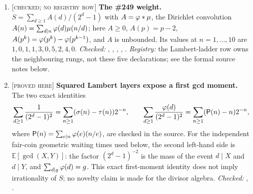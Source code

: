 \documentclass[11pt]{article}
\newcommand{\Stot}{S}
\newcommand{\Aw}{A}
\newcommand{\stag}[1]{{\normalfont\footnotesize\textsc{[#1]}}}
\begin{document}
{\begin{enumerate}[label=\textbf{R\arabic*.},ref=R\arabic*,leftmargin=2.4em,
  itemsep=0.2em,topsep=0.25em]
The orbit-level form sharpens this rank barrier without closing it: under the
same non-irrationality hypothesis, the same carry also has uniformly eventual
dyadic-section periodicity modulo $v$, as recorded by
.
This does not turn quotient periodicity into a finite-$\mathbb Q$-rank bound.
Indeed, if $p\mid v$, the totient forcing disappears modulo $p$ and the carry
is the homogeneous geometric orbit $u_N\equiv2^N u_0$ modulo $p$
(;
).
This is the natural obstruction to extracting the missing finite-rank upper
bound, so the irrationality of $\Stot$ remains open.

\item\label{res:weight} \stag{checked; no registry row}
\textbf{The \#249 weight.}  $\Stot=\sum_{d\ge1}\Aw(d)/(2^d-1)$ with
$\Aw=\ph*\mu$, the Dirichlet convolution
$\Aw(n)=\sum_{d\mid n}\ph(d)\mu(n/d)$; here $\Aw\ge0$, $\Aw(p)=p-2$,
$\Aw(p^k)=\ph(p^k)-\ph(p^{k-1})$, and $\Aw$ is unbounded.  Its values at
$n=1,\dots,10$ are $1,0,1,1,3,0,5,2,4,0$.
{\footnotesize\emph{Checked:}
,
,
,
,
.
\emph{Registry:} the Lambert-ladder row owns the neighbouring rungs, not these
five declarations; see the formal source notes below.}

\item\label{res:gcdmoment} \stag{proved here}
\textbf{Squared Lambert layers expose a first gcd moment.}  The two exact
identities
\[
  \sum_{d\ge1}\frac{1}{(2^d-1)^2}
    =\sum_{n\ge1}(\sigma(n)-\tau(n))2^{-n},
  \qquad
  \sum_{d\ge1}\frac{\varphi(d)}{(2^d-1)^2}
    =\sum_{n\ge1}(\mathsf P(n)-n)2^{-n},
\]
where $\mathsf P(n)=\sum_{e\mid n}\varphi(e)(n/e)$, are checked in the
source.  For the independent fair-coin geometric waiting times used below,
the second left-hand side is $\mathbb E[\gcd(X,Y)]$: the factor
$(2^d-1)^{-2}$ is the mass of the event $d\mid X$ and $d\mid Y$, and
$\sum_{d\mid g}\varphi(d)=g$.  This exact first-moment identity does not imply
irrationality of $\Stot$; no novelty claim is made for the
divisor algebra.
{\footnotesize\emph{Checked:}
,
.}


\end{enumerate}}
\end{document}
